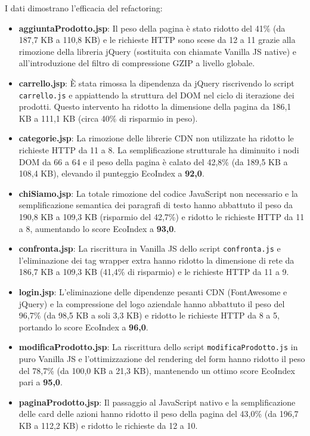 I dati dimostrano l'efficacia del refactoring:
\begin{itemize}
    \item \textbf{aggiuntaProdotto.jsp}: Il peso della pagina è stato ridotto del 41\% (da 187,7 KB a 110,8 KB) e le richieste HTTP sono scese da 12 a 11 grazie alla rimozione della libreria jQuery (sostituita con chiamate Vanilla JS native) e all'introduzione del filtro di compressione GZIP a livello globale.
    \item \textbf{carrello.jsp}: È stata rimossa la dipendenza da jQuery riscrivendo lo script \texttt{carrello.js} e appiattendo la struttura del DOM nel ciclo di iterazione dei prodotti. Questo intervento ha ridotto la dimensione della pagina da 186,1 KB a 111,1 KB (circa 40\% di risparmio in peso).
    \item \textbf{categorie.jsp}: La rimozione delle librerie CDN non utilizzate ha ridotto le richieste HTTP da 11 a 8. La semplificazione strutturale ha diminuito i nodi DOM da 66 a 64 e il peso della pagina è calato del 42,8\% (da 189,5 KB a 108,4 KB), elevando il punteggio EcoIndex a \textbf{92,0}.
    \item \textbf{chiSiamo.jsp}: La totale rimozione del codice JavaScript non necessario e la semplificazione semantica dei paragrafi di testo hanno abbattuto il peso da 190,8 KB a 109,3 KB (risparmio del 42,7\%) e ridotto le richieste HTTP da 11 a 8, aumentando lo score EcoIndex a \textbf{93,0}.
    \item \textbf{confronta.jsp}: La riscrittura in Vanilla JS dello script \texttt{confronta.js} e l'eliminazione dei tag wrapper extra hanno ridotto la dimensione di rete da 186,7 KB a 109,3 KB (41,4\% di risparmio) e le richieste HTTP da 11 a 9.
    \item \textbf{login.jsp}: L'eliminazione delle dipendenze pesanti CDN (FontAwesome e jQuery) e la compressione del logo aziendale hanno abbattuto il peso del 96,7\% (da 98,5 KB a soli 3,3 KB) e ridotto le richieste HTTP da 8 a 5, portando lo score EcoIndex a \textbf{96,0}.
    \item \textbf{modificaProdotto.jsp}: La riscrittura dello script \texttt{modificaProdotto.js} in puro Vanilla JS e l'ottimizzazione del rendering del form hanno ridotto il peso del 78,7\% (da 100,0 KB a 21,3 KB), mantenendo un ottimo score EcoIndex pari a \textbf{95,0}.
    \item \textbf{paginaProdotto.jsp}: Il passaggio al JavaScript nativo e la semplificazione delle card delle azioni hanno ridotto il peso della pagina del 43,0\% (da 196,7 KB a 112,2 KB) e ridotto le richieste da 12 a 10.

\end{itemize}
